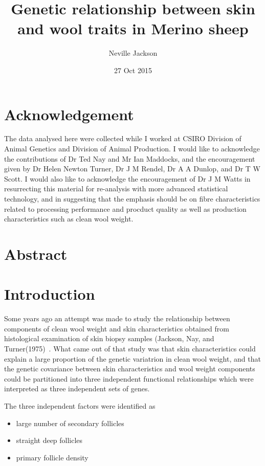 \documentclass[titlepage]{article}  %
\title{ Genetic relationship between skin and wool traits in Merino sheep}
\author{Neville Jackson }
\date{27 Oct 2015}
\begin{document}
 
 
\maketitle      
\tableofcontents

\clearpage
\section{Acknowledgement}
The data analysed here were collected while I worked at CSIRO Division of Animal Genetics and Division of Animal Production. I would like to acknowledge the contributions of Dr Ted Nay and Mr Ian Maddocks, and the encouragement given by Dr Helen Newton Turner, Dr J M Rendel, Dr A A Dunlop, and Dr T W Scott. I would also like to acknowledge the encouragement of Dr J M Watts in resurrecting this material for re-analysis with more advanced statistical technology, and in suggesting that the emphasis should be on fibre characteristics related to processing performance and procduct quality as well as production characteristics such as clean wool weight.


\clearpage
\section{Abstract}

\clearpage
\section{Introduction} 
	Some years ago an attempt was made to study the relationship between components of clean wool weight and skin characteristics obtained from histological examination of skin biopsy samples (Jackson, Nay, and Turner(1975)~\cite{jack:75}. What came out of that study was that skin characteristics could explain a large proportion of the genetic variatrion in clean wool weight, and that the genetic covariance between skin characteristics and wool weight components could be partitioned into three independent functional relationships which were interpreted as three independent sets of genes.

	The three independent factors were identified as 
\begin{itemize}
\item large number of secondary follicles
\item straight deep follicles
\item primary follicle density
\end{itemize}
\end{document}
